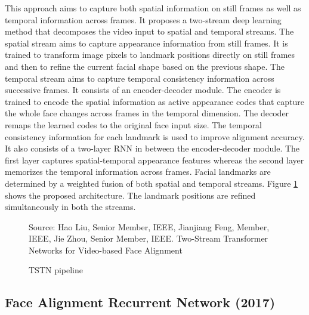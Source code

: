 \documentclass{llncs}
\begin{document}
This approach aims to capture both spatial information on still frames as well as temporal information across frames. It proposes a two-stream deep learning method that decomposes the video input to spatial and temporal streams. The spatial stream aims to capture appearance information from still frames. It is trained to transform image pixels to landmark positions directly on still frames and then to refine the current facial shape based on the previous shape. The temporal stream aims to capture temporal consistency information across successive frames. It consists of an encoder-decoder module. The encoder is trained to encode the spatial information as active appearance codes that capture the whole face changes across frames in the temporal dimension. The decoder remaps the learned codes to the original face input size. The temporal consistency information for each landmark is used to improve alignment accuracy. It also consists of a two-layer RNN in between the encoder-decoder module. The first layer captures spatial-temporal appearance features whereas the second layer memorizes the temporal information across frames. Facial landmarks are determined by a weighted fusion of both spatial and temporal streams. Figure \ref{TSTN} shows the proposed architecture. The landmark positions are refined simultaneously in both the streams.

\begin{figure}
%
{Source: Hao Liu, Senior Member, IEEE, Jianjiang Feng, Member, IEEE, Jie Zhou, Senior Member, IEEE. Two-Stream Transformer Networks for Video-based Face Alignment}
\caption{TSTN pipeline}
\label{TSTN}
\end{figure}




\subsection{Face Alignment Recurrent Network (2017) \cite{farn}}
\end{document}
